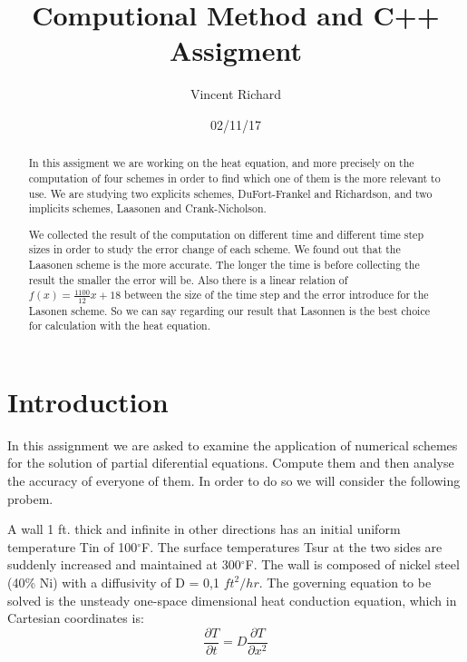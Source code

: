 \documentclass [10 pt, a4 paper]{article}
\author{Vincent Richard}
\date{02/11/17}
\title{Computional Method and C++ Assigment}
\begin{document}
\begin{titlepage}
    \maketitle
\end{titlepage}
\newpage

\tableofcontents
\listoffigures
\newpage

\begin{abstract}
    In this assigment we are working on the heat equation, and more precisely on the 
    computation of four schemes in order to find which one of them is the more relevant 
    to use. We are studying two explicits schemes, DuFort-Frankel and Richardson, and two
    implicits schemes, Laasonen and Crank-Nicholson.

    We collected the result of the computation on different time and different time step sizes
    in order to study the error change of each scheme. We found out that the Laasonen scheme is 
    the more accurate. The longer the time is before collecting the result the smaller 
    the error will be. Also there is a linear relation of $f(x) = \frac{1100}{12} x + 18$ 
    between the size of the time step and the error introduce for the Lasonen scheme. So we
    can say regarding our result that Lasonnen is the best choice for calculation with the
    heat equation.
\end{abstract}


\section{Introduction}

In this assignment we are asked to examine the application of numerical schemes
for the solution of partial diferential equations. Compute them and then analyse the accuracy
of everyone of them. In order to  do so we will consider the following probem.

A wall 1 ft. thick and infinite in other directions has an initial uniform temperature Tin of 
100$^{\circ}$F. The surface temperatures Tsur at the two
sides are suddenly increased and maintained at 300$^{\circ}$F. The wall is composed of
nickel steel (40\% Ni) with a diffusivity of D = 0,1 $ft^{2}/hr$.
The governing equation to be solved is the unsteady one-space dimensional
heat conduction equation, which in Cartesian coordinates is:
\begin{equation}
    \frac{\partial T}{\partial t} = D \frac{\partial T}{\partial x^{2}}
\end{equation}
\end{document}
